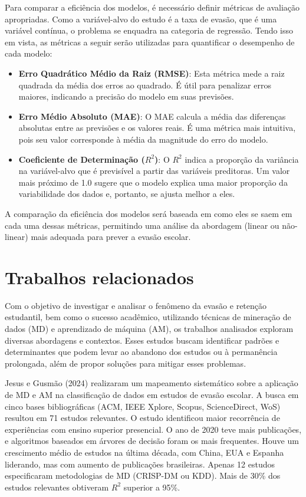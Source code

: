 \documentclass[english, spanish, brazilian]{RBIEarticle} %
\begin{document}
Para comparar a eficiência dos modelos, é necessário definir métricas de avaliação apropriadas. Como a variável-alvo do estudo é a taxa de evasão, que é uma variável contínua, o problema se enquadra na categoria de regressão. Tendo isso em vista, as métricas a seguir serão utilizadas para quantificar o desempenho de cada modelo:
\begin{itemize}
    \item \textbf{Erro Quadrático Médio da Raiz (RMSE)}: Esta métrica mede a raiz quadrada da média dos erros ao quadrado. É útil para penalizar erros maiores, indicando a precisão do modelo em suas previsões.
    \item \textbf{Erro Médio Absoluto (MAE)}: O MAE calcula a média das diferenças absolutas entre as previsões e os valores reais. É uma métrica mais intuitiva, pois seu valor corresponde à média da magnitude do erro do modelo.
    \item \textbf{Coeficiente de Determinação ($R^2$)}: O $R^2$ indica a proporção da variância na variável-alvo que é previsível a partir das variáveis preditoras. Um valor mais próximo de 1.0 sugere que o modelo explica uma maior proporção da variabilidade dos dados e, portanto, se ajusta melhor a eles.
\end{itemize}
A comparação da eficiência dos modelos será baseada em como eles se saem em cada uma dessas métricas, permitindo uma análise da abordagem (linear ou não-linear) mais adequada para prever a evasão escolar.

\section{Trabalhos relacionados}
Com o objetivo de investigar e analisar o fenômeno da evasão e retenção estudantil, bem como o sucesso acadêmico, utilizando técnicas de mineração de dados (MD) e aprendizado de máquina (AM), os trabalhos analisados exploram diversas abordagens e contextos. Esses estudos buscam identificar padrões e determinantes que podem levar ao abandono dos estudos ou à permanência prolongada, além de propor soluções para mitigar esses problemas.

Jesus e Gusmão (2024) realizaram um mapeamento sistemático sobre a aplicação de MD e AM na classificação de dados em estudos de evasão escolar. A busca em cinco bases bibliográficas (ACM, IEEE Xplore, Scopus, ScienceDirect, WoS) resultou em 71 estudos relevantes. O estudo identificou maior recorrência de experiências com ensino superior presencial. O ano de 2020 teve mais publicações, e algoritmos baseados em árvores de decisão foram os mais frequentes. Houve um crescimento médio de estudos na última década, com China, EUA e Espanha liderando, mas com aumento de publicações brasileiras. Apenas 12 estudos especificaram metodologias de MD (CRISP-DM ou KDD). Mais de 30\% dos estudos relevantes obtiveram $R^2$ superior a 95\%.
\end{document}
